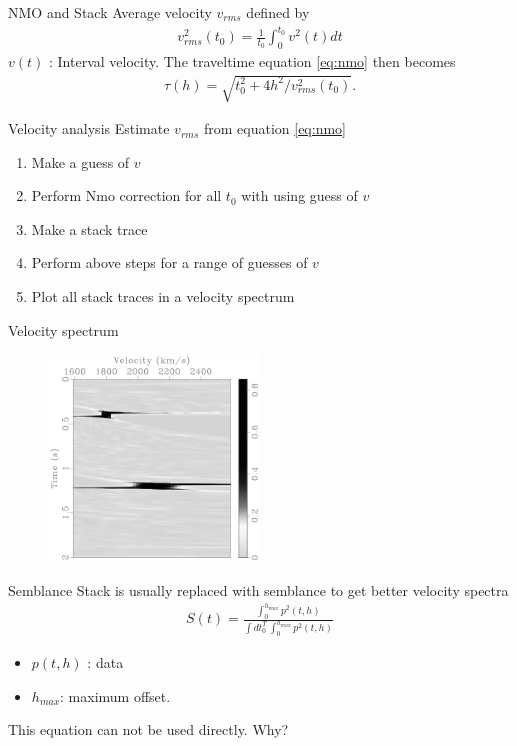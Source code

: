 \documentclass[xcolor=dvipsnames,notes]{beamer}
\begin{document}
\begin{frame}{NMO and Stack}
Average velocity $v_{rms}$ defined by
\begin{eqnarray}
 v^2_{rms}(t_0)=\frac{1}{t_0}\int^{t_0}_0 v^2(t)dt
\label{eq:rms}
\end{eqnarray}
$v(t)$ : Interval velocity.
The traveltime equation \eqref{eq:nmo} then becomes
\begin{eqnarray}
\tau(h)=\sqrt{t^2_0+4h^2/v^2_{rms}(t_0)}.
\label{eq:nmorms}
\end{eqnarray}
\end{frame}
\begin{frame}{Velocity analysis}
%
  Estimate $v_{rms}$ from equation \eqref{eq:nmo}
\begin{enumerate}
  \item Make a guess of $v$ 
  \item Perform Nmo correction for all $t_0$ with using guess of $v$
  \item Make a stack trace
  \item Perform above steps for a range of guesses of $v$
  \item Plot all stack traces in a velocity spectrum
\end{enumerate}
\end{frame}
\begin{frame}{Velocity spectrum}
\begin{figure}
 \includegraphics[width=0.50\textwidth]{Fig/synscn.pdf}
\end{figure}
\end{frame}
\begin{frame}{Semblance}
Stack is usually replaced with semblance to
get better velocity spectra  
\begin{eqnarray}
S(t) = \frac{\int_0^{h_{max}} p^2(t,h)}{\int dt_0^T\, \int_0^{h_{max}} p^2(t,h)}
\end{eqnarray}
\begin{itemize}
 \item $p(t,h)$ : data 
 \item $h_{max}$: maximum offset. 
\end{itemize}
This equation can not be used directly.  Why?
\end{frame}
\end{document}
